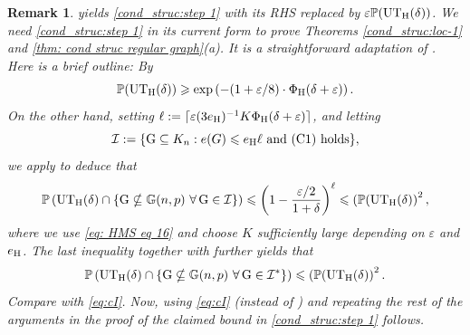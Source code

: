 \documentclass[a4paper,11pt,english,reqno]{amsart}
\numberwithin{equation}{section}
\renewcommand{\leq}{\leqslant}
\renewcommand{\geq}{\geqslant}
\newcommand{\UTH}{\textup{UT}_{\textup{H}}(\delta)}
\newcommand{\uH}{\textup{H}}
\renewcommand{\P}{\mathbb{P}}
\newcommand{\G}{\mathbb{G}}
\newcommand{\tu}[1]{\textup{#1}}
\newtheorem{remark}[theorem]{Remark}
\begin{document}
\begin{remark}
		\label{rmk:HMS-improve}
		\cite[Theorem~3.1]{HMS} yields \eqref{cond_struc:step 1} with its RHS replaced by $\varepsilon \P(\UTH)$. We  need \eqref{cond_struc:step 1} in its current form to prove Theorems \ref{cond_struc:loc-1} and \ref{thm: cond struc regular graph}(a). It is a straightforward adaptation of \cite[Theorem~3.1]{HMS}. Here is a brief outline: By \cite[Eqn.~(16)]{HMS}
		\begin{equation}
			\label{eq: HMS eq 16}
			\P(\UTH)\geq \exp\left(-(1+\varepsilon/8)\cdot\Phi_{\uH}(\delta+\varepsilon)\right).
		\end{equation}
On the other hand, setting $\ell:= \lceil \varepsilon (3e_{\tu H})^{-1} K \Phi_{\tu H}(\delta+\varepsilon)\rceil$, and letting
\[
\mathcal{I}:= \{\tu G \subseteq K_n: e(G) \leq e_{\tu H} \ell \text{ and (C1) holds}\},
\]
we apply \cite[Lemma 3.7]{HMS} to deduce that
\[
\P\left(\UTH \cap \left\{\tu{G}\nsubseteq \G(n,p)\ \forall \, \tu{G}\in \mathcal{I}\right\}\right) \leq \left(1-\frac{\varepsilon/2}{1+\delta}\right)^\ell \leq \left(\P(\UTH\right)^2,
\]		
where we use \eqref{eq: HMS eq 16} and choose $K$ sufficiently large depending on $\varepsilon$ and $e_{\tu H}$. The last inequality together with \cite[Lemma 3.8]{HMS} further yields that
\begin{equation}\label{eq:cI}
\P\left(\UTH \cap \left\{\tu{G}\nsubseteq \G(n,p)\ \forall \, \tu{G}\in \mathcal{I}^*\right\}\right) \leq \left(\P(\UTH\right)^2.
\end{equation}
Compare \cite[Eqn.~(17)]{HMS} with \eqref{eq:cI}. Now, using \eqref{eq:cI} (instead of \cite[Eqn.~(17)]{HMS}) and repeating the rest of the arguments in the proof of \cite[Theorem 3.1]{HMS} the claimed bound in \eqref{cond_struc:step 1} follows. 
\end{remark}
		
\end{document}
